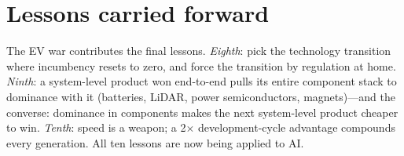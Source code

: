 \section{Lessons carried forward}

The EV war contributes the final lessons. \emph{Eighth}: pick the technology transition where incumbency resets to zero, and force the transition by regulation at home. \emph{Ninth}: a system-level product won end-to-end pulls its entire component stack to dominance with it (batteries, LiDAR, power semiconductors, magnets)---and the converse: dominance in components makes the next system-level product cheaper to win. \emph{Tenth}: speed is a weapon; a 2$\times$ development-cycle advantage compounds every generation. All ten lessons are now being applied to AI.
